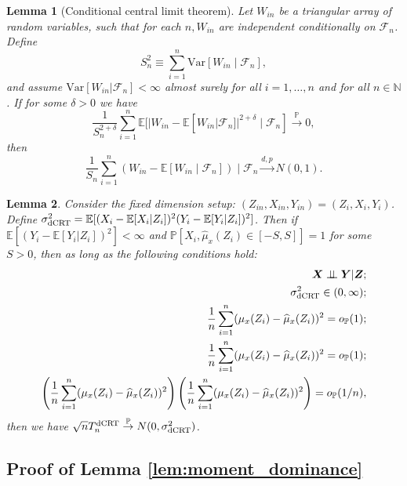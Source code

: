 \documentclass[12pt]{article}
\newtheorem{lemma}{Lemma}
\theoremstyle{definition}
\newcommand{\indep}{\perp \!\!\! \perp}
\def\P{\mathbb{P}}
\def\P{\mathbb{P}}
\newcommand{\E}{\mathbb E}								%
\newcommand{\V}{\mathrm{Var}}							%
\renewcommand{\P}{\mathbb{P}}							%
\newcommand{\convp}{\overset{\mathbb{P}}{\rightarrow}}             %
\newcommand{\prx}{\bm X}								%
\newcommand{\srx}{X}									%
\newcommand{\prz}{\bm Z}								%
\newcommand{\srz}{Z}									%
\newcommand{\pry}{{\bm Y}}								%
\newcommand{\sry}{Y}									%
\newcommand{\dCRT}{\textnormal{dCRT}} 					%
\newcommand{\convdp}{\overset {d,p} \longrightarrow}    %
\begin{document}
\begin{lemma}[Conditional central limit theorem] \label{lem:lyapunov-clt} 
	Let $W_{in}$ be a triangular array of random variables, such that for each $n,W_{in}$ are independent conditionally on $\mathcal F_n$. Define
	\begin{equation}
		S_n^2 \equiv \sum_{i = 1}^n \V[W_{in} \mid \mathcal F_n],
	\end{equation} 
	and assume $\mathrm{Var}[W_{in}|\mathcal{F}_n]<\infty $ almost surely for all $i=1,\ldots,n$ and for all $n\in\mathbb{N}$. If for some $\delta > 0$ we have
	\begin{equation}
		\frac{1}{S_n^{2+\delta}} \sum_{i = 1}^n \E[|W_{in}-\E[W_{in}|\mathcal{F}_n]|^{2+\delta} \mid \mathcal{F}_n] \convp 0,
		\label{eq:conditional-lyapunov}
	\end{equation}
	then 
	\begin{equation}
		\frac{1}{S_n} \sum_{i = 1}^n (W_{in} - \E[W_{in} \mid \mathcal{F}_n]) \mid \mathcal F_n \convdp N(0,1).
	\end{equation}
\end{lemma}

\begin{lemma}\label{lem:dCRT_convergence}
  Consider the fixed dimension setup: $(\srz_{in},\srx_{in},\sry_{in})=(\srz_{i},\srx_{i},\sry_{i})$. Define $\sigma_{\dCRT}^2=\E[(\srx_i-\E[\srx_i|\srz_i])^2(\sry_i-\E[\sry_i|\srz_i])^2]$. Then if $\E[(\sry_i-\E[\sry_i|\srz_i])^2]<\infty$ and $\P[\srx_i,\widehat{\mu}_x(\srz_i)\in [-S,S]]=1$ for some $S>0$, then as long as the following conditions hold:
  \begin{align*}
    \prx\indep\pry|\prz;\\
    \sigma_{\dCRT}^2\in (0,\infty);\\
    \frac{1}{n}\sum_{i=1}^n (\mu_{x}(\srz_i)-\widehat\mu_{x}(\srz_i))^2=o_{\P}(1);\\
    \frac{1}{n}\sum_{i=1}^n (\mu_{x}(\srz_i)-\widehat\mu_{x}(\srz_i))^2=o_{\P}(1);\\
    \left(\frac{1}{n}\sum_{i=1}^n (\mu_{x}(\srz_i)-\widehat\mu_{x}(\srz_i))^2\right)\left(
    \frac{1}{n}\sum_{i=1}^n (\mu_{x}(\srz_i)-\widehat\mu_{x}(\srz_i))^2\right)=o_{\P}(1/n),
  \end{align*}
  then we have $\sqrt{n}T_n^{\dCRT}\convp N(0,\sigma_{\dCRT}^2)$.
\end{lemma}

\subsection{Proof of Lemma \ref{lem:moment_dominance}}
\end{document}

